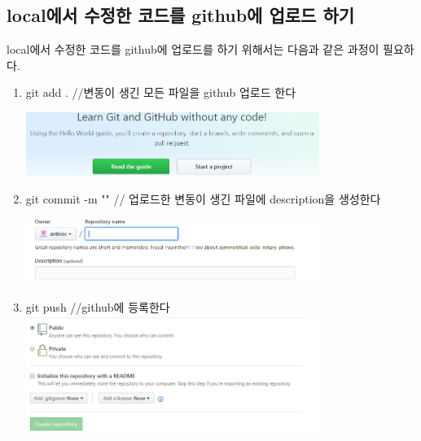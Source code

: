\documentclass[12pt]{article}
\begin{document}
		\subsection{local에서 수정한 코드를 github에 업로드 하기}
	local에서 수정한 코드를 github에 업로드를 하기 위해서는 다음과 같은 과정이 필요하다.
	\begin{mdframed}[
		linecolor= black,
		roundcorner=10pt,
		innertopmargin =\topskip,
		leftmargin = 0.5cm,
		rightmargin = 0.5cm,
		frametitleaboveskip = 0.5pt,
		frametitlerulewidth = 0.5pt,
		frametitlealignment =,
		frametitlebackgroundcolor = yellow,			
		frametitle = {githhub에 수정된 파일 올리기}	]
		\begin{enumerate}
			\item git add . //변동이 생긴 모든 파일을 github 업로드 한다
			
			\includegraphics[width=0.75\textwidth]{start}
			\item git commit -m "" // 업로드한 변동이 생긴 파일에 description을 생성한다
			
			\includegraphics[width=0.75\textwidth]{owner}
			\item git push //github에 등록한다
			\includegraphics[width=0.75\textwidth]{publc}
		\end{enumerate}  		
	\end{mdframed} 
\end{document}
